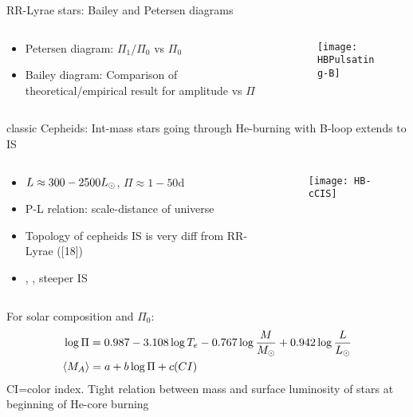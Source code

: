 \begin{frame}{RR-Lyrae stars: Bailey and Petersen diagrams}
\begin{columns}[T]
\begin{column}{0.55\textwidth}
	\begin{itemize}
	\item Petersen diagram: $\Pi_1/\Pi_0$ vs $\Pi_0$
	\item Bailey diagram: Comparison of theoretical/empirical result for amplitude vs $\Pi$
	\end{itemize}
	\end{column}
	\begin{column}{0.45\textwidth}
	\begin{figure}[!ht]
	\texttt{[image: HBPulsating-B]}\label{fig:HBPulsating-B}
	\end{figure}
\end{column}\end{columns}
\end{frame}

\begin{frame}{classic Cepheids: Int-mass stars going through He-burning with B-loop extends to IS}
\begin{columns}[T]
	\begin{column}{0.55\textwidth}
		\begin{itemize}
			\item $L\approx300-2500L_{\odot}$, $\Pi\approx1-50\si{\day}$
			\item P-L relation: scale-distance of universe
			\item Topology of cepheids IS is very diff from RR-Lyrae ([18])
			\item {}, , steeper IS
		\end{itemize}
	\end{column}
	\begin{column}{0.45\textwidth}
		\begin{figure}[!ht]
			\texttt{[image: HB-cCIS]}\label{fig:HB-cCIS}
		\end{figure}
\end{column}\end{columns}
For solar composition and $\Pi_0$:
\begin{align*}
&\log{\Pi}=0.987-3.108\log{T_e}-0.767\log{\frac{M}{M_{\odot}}}+0.942\log{\frac{L}{L_{\odot}}}\\
&\langle M_A \rangle=a+b\log{\Pi}+c(CI)
\end{align*}
CI=color index. Tight relation between mass and surface luminosity of stars at beginning of He-core burning
\end{frame}

